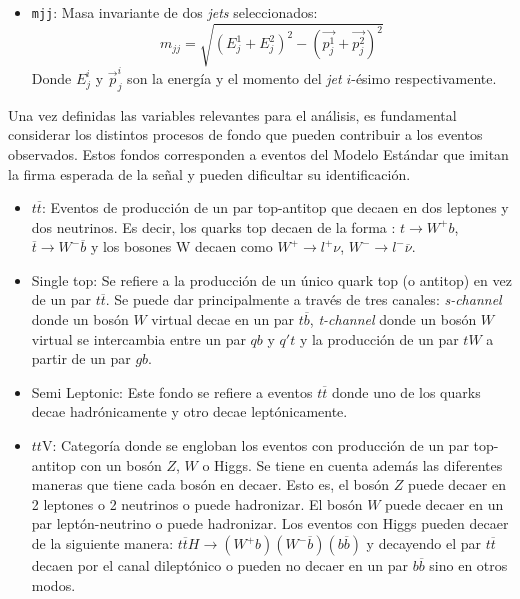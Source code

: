 \begin{itemize}
    \item[\ding{220}] \texttt{mjj}: Masa invariante de dos \textit{jets} seleccionados:
    $$
    m_{j j} = \sqrt{(E_{j}^1 + E_j^2)^2-(\vec{p_j^1}+\vec{p_j^2})^2}
    $$
    Donde $E_j^i$ y $\vec{p}_j^i$ son la energía y el momento del \textit{jet} $i$-ésimo respectivamente.
\end{itemize}

Una vez definidas las variables relevantes para el análisis, es fundamental considerar los distintos procesos de fondo que pueden contribuir a los eventos observados. Estos fondos corresponden a eventos del Modelo Estándar que imitan la firma esperada de la señal y pueden dificultar su identificación.

\begin{itemize}
    \item[\ding{220}] $t\overline{t}$: Eventos de producción de un par top-antitop que decaen en dos leptones y dos neutrinos. Es decir, los quarks top decaen de la forma : $t \rightarrow W^+b$, $\overline{t} \rightarrow W^-\overline{b}$ y los bosones W decaen como $W^+ \rightarrow l^+\nu$, $W^- \rightarrow l^-\overline{\nu}$.

    \item[\ding{220}] Single top: Se refiere a la producción de un único quark top (o antitop)  en vez de un par $t\overline{t}$. Se puede dar principalmente a través de tres canales: \textit{s-channel} donde un bosón $W$ virtual decae en un par $t\overline{b}$, \textit{t-channel} donde un bosón $W$  virtual se intercambia entre un par $qb$ y $q't$ y la producción de un par $tW$ a partir de un par $gb$. \cite{SingleTop}

    \item[\ding{220}] Semi Leptonic: Este fondo se refiere a eventos $t\overline{t}$ donde uno de los quarks decae hadrónicamente y otro decae leptónicamente.

    \item[\ding{220}] $tt$V: Categoría donde se engloban los eventos con producción de un par top-antitop con un bosón $Z$, $W$ o Higgs. Se tiene en cuenta además las diferentes maneras que tiene cada bosón en decaer. Esto es, el bosón $Z$ puede decaer en 2 leptones o 2 neutrinos o puede hadronizar. El bosón $W$ puede decaer en un par leptón-neutrino o puede hadronizar.  Los eventos con Higgs pueden decaer de la siguiente manera: $t\overline{t}H \rightarrow (W^+b)(W^-\overline{b})(b\overline{b})$ y decayendo el par $t\overline{t}$ decaen por el canal dileptónico o pueden no decaer en un par $b\overline{b}$ sino en otros modos. \cite{ttV}
    

\end{itemize}
